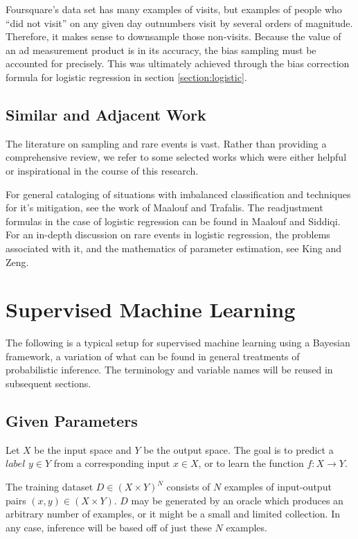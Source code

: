 \documentclass[twoside]{article}
\begin{document}
Foursquare's data set has many examples of visits, but examples of people who “did not visit” on any given day outnumbers visit by several orders of magnitude. Therefore, it makes sense to downsample those non-visits. Because the value of an ad measurement product is in its accuracy, the bias sampling must be accounted for precisely. This was ultimately achieved through the bias correction formula for logistic regression in section \ref{section:logistic}.

\subsection{Similar and Adjacent Work}

The literature on sampling and rare events is vast. Rather than providing a comprehensive review, we refer to some selected works which were either helpful or inspirational in the course of this research.

For general cataloging of situations with imbalanced classification and techniques for it's mitigation, see the work of Maalouf and Trafalis\cite{rareevents}. The readjustment formulas in the case of logistic regression can be found in Maalouf and Siddiqi\cite{weightedlogistic}. For an in-depth discussion on rare events in logistic regression, the problems associated with it, and the mathematics of parameter estimation, see King and Zeng\cite{king}.

\section{Supervised Machine Learning} \label{framework}

The following is a typical setup for supervised machine learning using a Bayesian framework, a variation of what can be found in general treatments of probabilistic inference\cite{pythonbayes}\cite{gelmanbayes}\cite{blais}. The terminology and variable names will be reused in subsequent sections.

\subsection{Given Parameters}

Let \(X\) be the input space and \(Y\) be the output space. The goal is to predict a \(label\) \(y \in Y\) from a corresponding input \(x \in X\), or to learn the function \(f: X \to Y\).

The training dataset \(D \in (X \times Y)^N\) consists of \(N\) examples of input-output pairs \((x, y) \in (X \times Y) \). \(D\) may be generated by an oracle which produces an arbitrary number of examples, or it might be a small and limited collection. In any case, inference will be based off of just these \(N\) examples.
\end{document}
